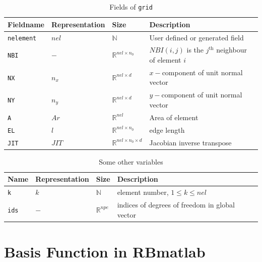\documentclass[a4paper]{book}
\begin{document}
\begin{table}[H]
\cprotect\caption{Fields of \verb|grid|}
\label{table_grid}
\begin{center}
\begin{tabular}{| p{}| p{} |  p{} | p{}|}
\hline
\textbf{Fieldname} & \textbf{Representation} & \textbf{Size} & \textbf{Description}\\
\hline
\verb|nelement| & $nel$ & $\mathbb{N}$ & User defined or generated field\\
\hline
\verb|NBI| & $-$ & $\mathbb{R}^{nel \times n_0}$ & $NBI(i,j)$ is the $j^{\textrm{th}}$ neighbour of element $i$\\
\hline
\verb|NX| & $n_x$ & $\mathbb{R}^{nel \times d}$ & $x-$component of unit normal vector\\
\hline
\verb|NY| & $n_y$ & $\mathbb{R}^{nel \times d}$ & $y-$component of unit normal vector\\
\hline
\verb|A| & $Ar$ & $\mathbb{R}^{nel}$ & Area of element\\
\hline
\verb|EL| & $l$ & $\mathbb{R}^{nel \times n_0}$ & edge length\\
\hline
\verb|JIT| & $JIT$ & $\mathbb{R}^{nel \times n_0 \times d}$ & Jacobian inverse transpose\\
\hline
\end{tabular}
\end{center}
\end{table}

\begin{table}[H]
\caption{Some other variables}
\label{table_variable}
\begin{center}
\begin{tabular}{| p{}| p{} |  p{} | p{}|}
\hline
\textbf{Name} & \textbf{Representation} & \textbf{Size} & \textbf{Description}\\
\hline
\verb|k| & $k$ & $\mathbb{N}$ & element number, $1 \leq k \leq nel$\\
\hline
\verb|ids| & $-$ & $\mathbb{R}^{npe}$ & indices of degrees of freedom in global vector\\
\hline
\end{tabular}
\end{center}
\end{table}

\section{Basis Function in RBmatlab}
\end{document}
